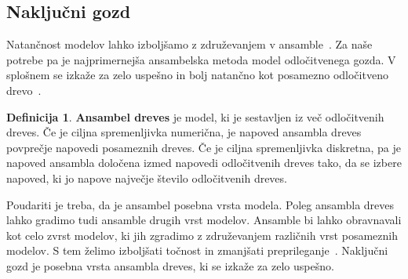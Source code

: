 \documentclass[12pt,a4paper,twoside]{article}
\theoremstyle{definition} %
\newtheorem{definicija}{Definicija}[section]
\theoremstyle{plain} %
\numberwithin{equation}{section}  %
\begin{document}
\subsection{Naključni gozd}

Natančnost modelov lahko izboljšamo z združevanjem v ansamble~\cite{zhou2012ensemble}.
Za naše potrebe pa je najprimernejša ansambelska metoda model odločitvenega gozda. 
V splošnem se izkaže za zelo uspešno in bolj natančno kot posamezno odločitveno drevo~\cite[pogl.\ 4]{louppe2015understanding}. 

\begin{definicija}
\textbf{Ansambel dreves} je model, ki je sestavljen iz več odločitvenih dreves. 
Če je ciljna spremenljivka numerična, je napoved ansambla dreves povprečje napovedi posameznih dreves. 
Če je ciljna spremenljivka diskretna, pa je napoved ansambla določena izmed napovedi odločitvenih dreves tako, da se izbere napoved, ki jo napove največje število odločitvenih dreves.
\end{definicija}

Poudariti je treba, da je ansambel posebna vrsta modela. 
Poleg ansambla dreves lahko gradimo tudi ansamble drugih vrst modelov. 
Ansamble bi lahko obravnavali kot celo zvrst modelov, ki jih zgradimo z združevanjem različnih vrst posameznih modelov. 
S tem želimo izboljšati točnost in zmanjšati preprileganje~\cite{zhou2012ensemble}. 
Naključni gozd je posebna vrsta ansambla dreves, ki se izkaže za zelo uspešno. %
\end{document}
